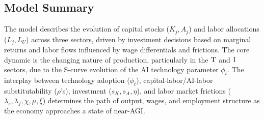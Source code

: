 \documentclass{article}
\newcommand{\sector}[1]{\textnormal{#1}}
\begin{document}
\subsection{Model Summary}
The model describes the evolution of capital stocks ($K_j, A_j$) and labor allocations ($L_j, L_U$) across three sectors, driven by investment decisions based on marginal returns and labor flows influenced by wage differentials and frictions. 
The core dynamic is the changing nature of production, particularly in the $\sector{T}$ and $\sector{I}$ sectors, due to the S-curve evolution of the AI technology parameter $\phi_t$. 
The interplay between technology adoption ($\phi_t$), capital-labor/AI-labor substitutability ($\rho$'s), investment ($s_K, s_A, \eta$), and labor market frictions ($\lambda_s, \lambda_f, \chi, \mu, \xi$) determines the path of output, wages, and employment structure as the economy approaches a state of near-AGI.
\end{document}
